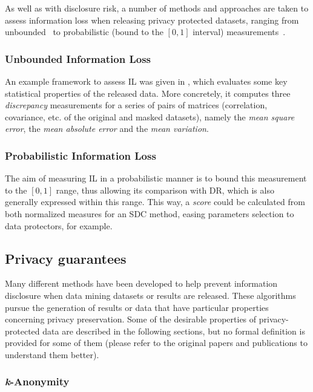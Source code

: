 As well as with disclosure risk, a number of methods and approaches are taken to assess information loss when releasing privacy protected datasets, ranging from unbounded~\citep{Domingo:SDCMethodsInfoLoss} to probabilistic (bound to the $[0,1]$ interval) measurements~\citep{Mateo:ProbInfLossMeasures}.

\subsubsection*{Unbounded Information Loss}

An example framework to assess IL was given in \citep{Domingo:SDCMethodsInfoLoss}, which evaluates some key statistical properties of the released data. More concretely, it computes three \textit{discrepancy} measurements for a series of pairs of matrices (correlation, covariance, etc. of the original and masked datasets), namely the \textit{mean square error}, the \textit{mean absolute error} and the \textit{mean variation}.

\subsubsection*{Probabilistic Information Loss}

The aim of measuring IL in a probabilistic manner is to bound this measurement to the $[0,1]$ range, thus allowing its comparison with DR, which is also generally expressed within this range. This way, a \textit{score} could be calculated from both normalized measures for an SDC method, easing parameters selection to data protectors, for example.

\subsection{Privacy guarantees}
\label{Theory:SDC:Guarantees}

Many different methods have been developed to help prevent information disclosure when data mining datasets or results are released. These algorithms pursue the generation of results or data that have particular properties concerning privacy preservation. Some of the desirable properties of privacy-protected data are described in the following sections, but no formal definition is provided for some of them (please refer to the original papers and publications to understand them better).

\subsubsection{\textit{k}-Anonymity}

